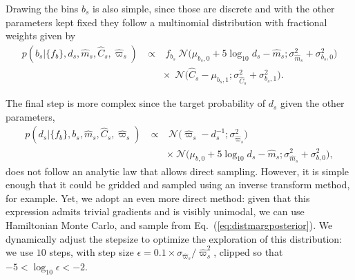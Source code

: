 \documentclass[manuscript, letterpaper]{aastex6}
\makeatletter
\let\origsubsection\subsection
\renewcommand\subsection{\@ifstar{\starsubsection}{\nostarsubsection}}
\newcommand\nostarsubsection[1]{\subsectionprelude\origsubsection{#1}}
\newcommand\starsubsection[1]{\subsectionprelude\origsubsection*{#1}}
\newcommand\subsectionprelude{\vspace{1em}}
\newcommand{\equref}[1]{{\xspace}Eq.~(\ref{#1})}
\newcommand{\eqn}[1]{\begin{eqnarray}#1\end{eqnarray}}
\makeatother
\begin{document}
Drawing the bins $b_s$ is also simple, since those are discrete and with the other parameters kept fixed they follow a multinomial distribution with fractional weights given by
\eqn{
	p\left(b_s \bigr\rvert \bigl\{ f_b \bigr\}, d_s, \hat{m}_s, \hat{C}_s, \hat{\varpi}_s\right) \ &\propto&  \ f_{b_s} \  \mathcal{N}\bigl( \mu_{b_s,0} + 5\log_{10}d_s  -\hat{m}_s ;\sigma_{\hat{m}_s}^2 + \sigma_{b_s,0}^2 \bigr) \\ && \times \  \ \mathcal{N}\bigl(\hat{C}_s - \mu_{b_s,1};\sigma_{\hat{C}_s}^2 + \sigma_{b_s,1}^2 \bigr).\nonumber
}

The final step is more complex since the target probability of $d_s$ given the other parameters,
\eqn{
	p\left(d_s \bigr\rvert \bigl\{ f_b \bigr\}, b_s, \hat{m}_s, \hat{C}_s, \hat{\varpi}_s\right) \ &\propto& \  \mathcal{N}\bigl(\hat{\varpi}_s - d_s^{-1};\sigma_{\hat{\varpi}_s}^2 \bigr) \\ && \times \  \mathcal{N}\bigl( \mu_{b,0} + 5\log_{10}d_s  -\hat{m}_s ;\sigma_{\hat{m}_s}^2 + \sigma_{b,0}^2 \bigr) ,\label{eq:distmargposterior}\nonumber
}
does not follow an analytic law that allows direct sampling.
However, it is simple enough that it could be gridded and sampled using an inverse transform method, for example.
Yet, we adopt an even more direct method: given that this expression admits trivial gradients and is visibly unimodal, we can use Hamiltonian Monte Carlo, and sample from \equref{eq:distmargposterior}. 
We dynamically adjust the stepsize to optimize the exploration of this distribution: we use $10$ steps, with step size $\epsilon = 0.1 \times \sigma_{\hat{\varpi}_s} / \hat{\varpi}_s^2$, clipped so that $-5 < \log_{10} \epsilon < -2$.


\subsection{Discussion}
\end{document}
